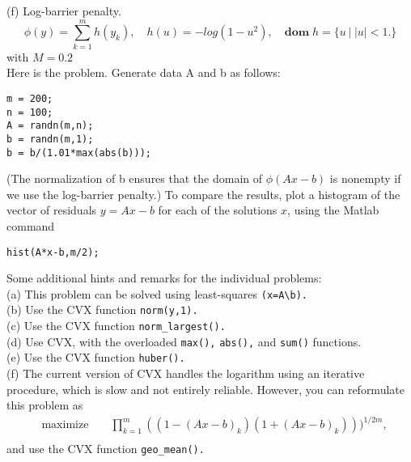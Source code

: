 \documentclass{article}
\begin{document}
(f) Log-barrier penalty. 
$$
\phi(y) = \sum_{k = 1}^m h(y_k), \quad 
h(u) = - log(1 - u^2), \quad
\boldsymbol{dom} \;h = \{u\,| \; |u| < 1.\}
$$
with $M = 0.2$
\\

Here is the problem. Generate data A and b as follows:

\begin{verbatim}
m = 200;
n = 100;
A = randn(m,n);
b = randn(m,1);
b = b/(1.01*max(abs(b)));
\end{verbatim}

(The normalization of b ensures that the domain of $\phi(Ax - b)$
is nonempty if we use the log-barrier penalty.) To compare the results, plot a histogram of the vector of residuals
$y = Ax - b$ for each
of the solutions $x$, using the Matlab command
\begin{verbatim}
hist(A*x-b,m/2);
\end{verbatim}

Some additional hints and remarks for the individual problems:\\
(a) This problem can be solved using least-squares \verb|(x=A\b).| \\
(b) Use the CVX function \verb|norm(y,1).|\\
(c) Use the CVX function \verb|norm_largest().| \\
(d) Use CVX, with the overloaded \verb|max(),| \verb|abs(),| and \verb|sum()|  functions.\\
(e) Use the CVX function \verb|huber().|\\
(f) The current version of CVX handles the logarithm using an iterative procedure, which is slow
and not entirely reliable. However, you can reformulate this problem as
\begin{align*}
&\text{maximize } && 
\prod_{k = 1}^m ((1 - (Ax - b)_k)(1 + (Ax - b)_k)))^{1 / 2m},  \\
\end{align*}
and use the CVX function \verb|geo_mean().|
\end{document}
